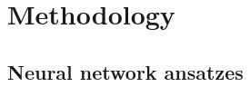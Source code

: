 
\chapter{Methodology}
\label{chapter4}

\ifpdf
    \graphicspath{{Chapter4/Figs/Raster/}{Chapter4/Figs/PDF/}{Chapter4/Figs/}}
\else
    \graphicspath{{Chapter4/Figs/Vector/}{Chapter4/Figs/}}
\fi

\section{Neural network ansatzes}
\label{section4.1}
